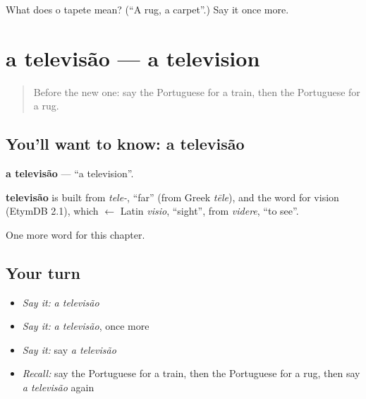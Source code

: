\begin{tcolorbox}[breakable,colback=teal!4,colframe=teal!35!black,title={Before you move on}]
What does o tapete mean? (\textquotedblleft{}A rug, a carpet\textquotedblright{}.) Say it once more.
\end{tcolorbox}
\section[a televisão]{a televisão — a television}

\label{lesson:PT-C93-televisao}



\begin{quote}
Before the new one: say the Portuguese for a train, then the Portuguese for a rug.
\end{quote}

\subsection*{You'll want to know: a televisão}
\textbf{a televisão} — \textquotedblleft{}a television\textquotedblright{}.

\begin{cousinweb}
\textbf{televisão} is built from \emph{tele-}, \textquotedblleft{}far\textquotedblright{} (from Greek \emph{tēle}), and the word for vision (EtymDB 2.1), which $\leftarrow$ Latin \emph{visio}, \textquotedblleft{}sight\textquotedblright{}, from \emph{videre}, \textquotedblleft{}to see\textquotedblright{}.
\end{cousinweb}

\begin{grammarlens}[title={What you've built}]
One more word for this chapter.
\end{grammarlens}

\subsection*{Your turn}
\begin{itemize}
\raggedright
  \item \emph{Say it:} \emph{a televisão}
  \item \emph{Say it:} \emph{a televisão}, once more
  \item \emph{Say it:} say \emph{a televisão}
  \item \emph{Recall:} say the Portuguese for a train, then the Portuguese for a rug, then say \emph{a televisão} again
\end{itemize}

